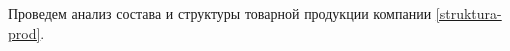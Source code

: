 Проведем анализ состава и структуры товарной продукции компании \ref{struktura-prod}.















































